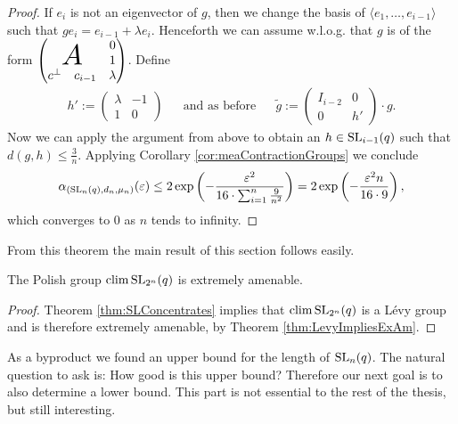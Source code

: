 \begin{proof}
	If $e_i$ is not an eigenvector of $g$, then we change the basis of $\langle e_1,\dots,e_{i-1}\rangle$ such that $ge_i=e_{i-1}+\lambda e_i$. Henceforth we can assume w.l.o.g. that $g$ is of the form 
	$\begin{pmatrix}
		       &         & 0       \\
		\multicolumn{2}{c}
		{\raisebox{\dimexpr\normalbaselineskip+.2\ht\strutbox-0.9\height}[0pt][0pt]
		{\scalebox{2.3}{$A$}}} &1\\
		c^\bot & c_{i-1} & \lambda 
	\end{pmatrix}
	$.
	Define 
	\begin{align*}
		h':=
		\begin{pmatrix}
			\lambda & -1 \\
			1       & 0  
		\end{pmatrix}
		&&\text{and as before}&& \tilde g:=
		\begin{pmatrix}
			I_{i-2} & 0  \\
			0       & h' 
		\end{pmatrix}\cdot g.
	\end{align*}
	Now we can apply the argument from above to obtain an $h\in \operatorname{SL}_{i-1}(q)$ such that $d(g,h)\leq\frac{3}{n}$. Applying Corollary \ref{cor:meaContractionGroups} we conclude
	\[\alpha_{(\operatorname{SL}_n(q), d_n, \mu_n)}(\varepsilon)\leq 2\exp\left(-\frac{\varepsilon^2}{16\cdot\sum_{i=1}^{n}\frac{9}{n^2}}\right)=2\exp\left(-\frac{\varepsilon^2 n}{16\cdot9}\right),\]
	which converges to 0 as $n$ tends to infinity. 
\end{proof}
		
From this theorem the main result of this section follows easily.
		
\begin{corollary}
	The Polish group $\operatorname{clim} \operatorname{SL}_{2^n}(q)$ is extremely amenable.
\end{corollary}
\begin{proof}
	Theorem \ref{thm:SLConcentrates} implies that $\operatorname{clim} \operatorname{SL}_{2^n}(q)$ is a L\'evy group and is therefore extremely amenable, by Theorem \ref{thm:LevyImpliesExAm}.
\end{proof}
		
As a byproduct we found an upper bound for the length of $\operatorname{SL}_n(q)$. The natural question to ask is: How good is this upper bound? Therefore our next goal is to also determine a lower bound. This part is not essential to the rest of the thesis, but still interesting.
		
